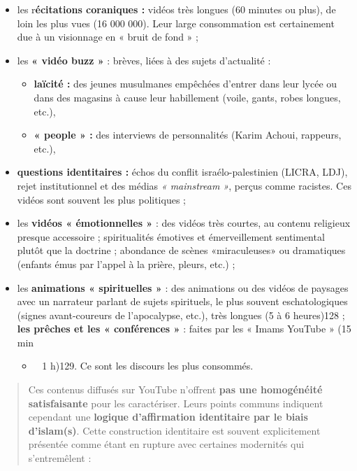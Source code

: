 \begin{itemize}
\item
  les r\textbf{écitations coraniques :} vidéos très longues (60 minutes
  ou plus), de loin les plus vues (16 000 000). Leur large consommation
  est certainement due à un visionnage en « bruit de fond » ;
\item
  les \textbf{« vidéo buzz »} : brèves, liées à des sujets d'actualité :

  \begin{itemize}
  \item
    \textbf{laïcité :} des jeunes musulmanes empêchées d'entrer dans
    leur lycée ou dans des magasins à cause leur habillement (voile,
    gants, robes longues, etc.),
  \item
    \textbf{« people » :} des interviews de personnalités (Karim Achoui,
    rappeurs, etc.),
  \end{itemize}
\item
  \textbf{questions identitaires :} échos du conflit israélo-palestinien
  (LICRA, LDJ), rejet institutionnel et des médias \emph{« mainstream
  »}, perçus comme racistes. Ces vidéos sont souvent les plus politiques
  ;
\item
  les \textbf{vidéos « émotionnelles »} : des vidéos très courtes, au
  contenu religieux presque accessoire ; spiritualités émotives et
  émerveillement sentimental plutôt que la doctrine ; abondance de
  scènes «miraculeuses» ou dramatiques (enfants émus par l'appel à la
  prière, pleurs, etc.) ;
\item
  les \textbf{animations « spirituelles »} : des animations ou des
  vidéos de paysages avec un narrateur parlant de sujets spirituels, le
  plus souvent eschatologiques (signes avant-coureurs de l'apocalypse,
  etc.), très longues (5 à 6 heures)128 ; \textbf{les prêches et les «
  conférences »} : faites par les « Imams YouTube » (15 min

  \begin{itemize}
  \item ~
    1 h)129. Ce sont les discours les plus consommés.
  \end{itemize}
\end{itemize}

\begin{quote}
Ces contenus diffusés sur YouTube n'offrent \textbf{pas une homogénéité
satisfaisante} pour les caractériser. Leurs points communs indiquent
cependant une \textbf{logique d'affirmation identitaire par le biais
d'islam(s)}. Cette construction identitaire est souvent explicitement
présentée comme étant en rupture avec certaines modernités qui
s'entremêlent :
\end{quote}

